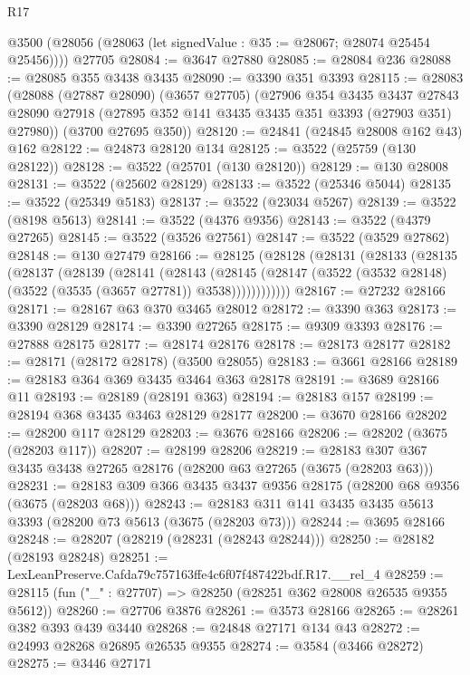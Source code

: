 \begin{lexlean}{R17}
\begin{coremodule}
    @3500 (@28056 (@28063 (let signedValue : @35 := @28067; @28074 @25454 @25456))))
    @27705
@28084 := @3647 @27880
@28085 := @28084 @236
@28088 := @28085 @355 @3438 @3435
@28090 := @3390 @351 @3393
@28115 := @28083
    (@28088
      (@27887 @28090)
      (@3657 @27705)
      (@27906
        @354
        @3435
        @3437
        @27843
        @28090
        @27918
        (@27895 @352 @141 @3435 @3435 @351 @3393 (@27903 @351) @27980))
      (@3700 @27695 @350))
@28120 := @24841 (@24845 @28008 @162 @43) @162
@28122 := @24873 @28120 @134
@28125 := @3522 (@25759 (@130 @28122))
@28128 := @3522 (@25701 (@130 @28120))
@28129 := @130 @28008
@28131 := @3522 (@25602 @28129)
@28133 := @3522 (@25346 @5044)
@28135 := @3522 (@25349 @5183)
@28137 := @3522 (@23034 @5267)
@28139 := @3522 (@8198 @5613)
@28141 := @3522 (@4376 @9356)
@28143 := @3522 (@4379 @27265)
@28145 := @3522 (@3526 @27561)
@28147 := @3522 (@3529 @27862)
@28148 := @130 @27479
@28166 := @28125
    (@28128
      (@28131
        (@28133
          (@28135
            (@28137
              (@28139
                (@28141
                  (@28143
                    (@28145
                      (@28147 (@3522 (@3532 @28148) (@3522 (@3535 (@3657 @27781)) @3538))))))))))))
@28167 := @27232 @28166
@28171 := @28167 @63 @370 @3465 @28012
@28172 := @3390 @363
@28173 := @3390 @28129
@28174 := @3390 @27265
@28175 := @9309 @3393
@28176 := @27888 @28175
@28177 := @28174 @28176
@28178 := @28173 @28177
@28182 := @28171 (@28172 @28178) (@3500 @28055)
@28183 := @3661 @28166
@28189 := @28183 @364 @369 @3435 @3464 @363 @28178
@28191 := @3689 @28166 @11
@28193 := @28189 (@28191 @363)
@28194 := @28183 @157
@28199 := @28194 @368 @3435 @3463 @28129 @28177
@28200 := @3670 @28166
@28202 := @28200 @117 @28129
@28203 := @3676 @28166
@28206 := @28202 (@3675 (@28203 @117))
@28207 := @28199 @28206
@28219 := @28183 @307 @367 @3435 @3438 @27265 @28176 (@28200 @63 @27265 (@3675 (@28203 @63)))
@28231 := @28183 @309 @366 @3435 @3437 @9356 @28175 (@28200 @68 @9356 (@3675 (@28203 @68)))
@28243 := @28183 @311 @141 @3435 @3435 @5613 @3393 (@28200 @73 @5613 (@3675 (@28203 @73)))
@28244 := @3695 @28166
@28248 := @28207 (@28219 (@28231 (@28243 @28244)))
@28250 := @28182 (@28193 @28248)
@28251 := LexLeanPreserve.Cafda79c757163ffe4c6f07f487422bdf.R17.__rel_4
@28259 := @28115 (fun ("_" : @27707) => @28250 (@28251 @362 @28008 @26535 @9355 @5612))
@28260 := @27706 @3876
@28261 := @3573 @28166
@28265 := @28261 @382 @393 @439 @3440
@28268 := @24848 @27171 @134 @43
@28272 := @24993 @28268 @26895 @26535 @9355
@28274 := @3584 (@3466 @28272)
@28275 := @3446 @27171

\end{coremodule}
\end{lexlean}

